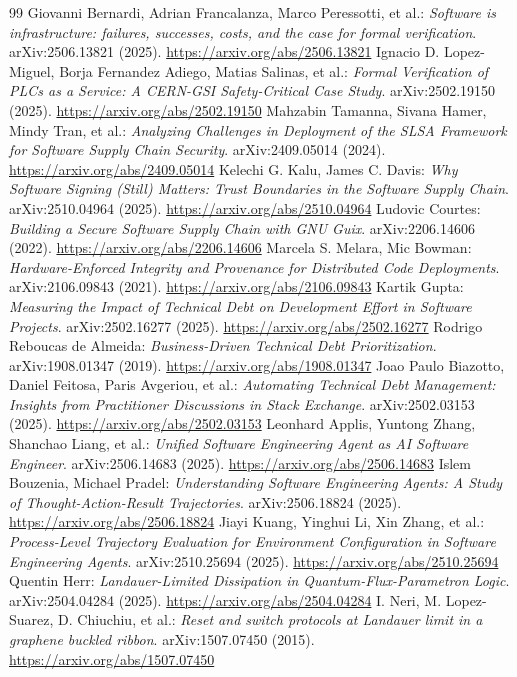 \documentclass[11pt,a4paper]{article}
\begin{document}
\begin{thebibliography}{99}
 Giovanni Bernardi, Adrian Francalanza, Marco Peressotti, et al.: \emph{Software is infrastructure: failures, successes, costs, and the case for formal verification}. arXiv:2506.13821 (2025). \url{https://arxiv.org/abs/2506.13821}
 Ignacio D. Lopez-Miguel, Borja Fernandez Adiego, Matias Salinas, et al.: \emph{Formal Verification of PLCs as a Service: A CERN-GSI Safety-Critical Case Study}. arXiv:2502.19150 (2025). \url{https://arxiv.org/abs/2502.19150}
 Mahzabin Tamanna, Sivana Hamer, Mindy Tran, et al.: \emph{Analyzing Challenges in Deployment of the SLSA Framework for Software Supply Chain Security}. arXiv:2409.05014 (2024). \url{https://arxiv.org/abs/2409.05014}
 Kelechi G. Kalu, James C. Davis: \emph{Why Software Signing (Still) Matters: Trust Boundaries in the Software Supply Chain}. arXiv:2510.04964 (2025). \url{https://arxiv.org/abs/2510.04964}
 Ludovic Courtes: \emph{Building a Secure Software Supply Chain with GNU Guix}. arXiv:2206.14606 (2022). \url{https://arxiv.org/abs/2206.14606}
 Marcela S. Melara, Mic Bowman: \emph{Hardware-Enforced Integrity and Provenance for Distributed Code Deployments}. arXiv:2106.09843 (2021). \url{https://arxiv.org/abs/2106.09843}
 Kartik Gupta: \emph{Measuring the Impact of Technical Debt on Development Effort in Software Projects}. arXiv:2502.16277 (2025). \url{https://arxiv.org/abs/2502.16277}
 Rodrigo Reboucas de Almeida: \emph{Business-Driven Technical Debt Prioritization}. arXiv:1908.01347 (2019). \url{https://arxiv.org/abs/1908.01347}
 Joao Paulo Biazotto, Daniel Feitosa, Paris Avgeriou, et al.: \emph{Automating Technical Debt Management: Insights from Practitioner Discussions in Stack Exchange}. arXiv:2502.03153 (2025). \url{https://arxiv.org/abs/2502.03153}
 Leonhard Applis, Yuntong Zhang, Shanchao Liang, et al.: \emph{Unified Software Engineering Agent as AI Software Engineer}. arXiv:2506.14683 (2025). \url{https://arxiv.org/abs/2506.14683}
 Islem Bouzenia, Michael Pradel: \emph{Understanding Software Engineering Agents: A Study of Thought-Action-Result Trajectories}. arXiv:2506.18824 (2025). \url{https://arxiv.org/abs/2506.18824}
 Jiayi Kuang, Yinghui Li, Xin Zhang, et al.: \emph{Process-Level Trajectory Evaluation for Environment Configuration in Software Engineering Agents}. arXiv:2510.25694 (2025). \url{https://arxiv.org/abs/2510.25694}
 Quentin Herr: \emph{Landauer-Limited Dissipation in Quantum-Flux-Parametron Logic}. arXiv:2504.04284 (2025). \url{https://arxiv.org/abs/2504.04284}
 I. Neri, M. Lopez-Suarez, D. Chiuchiu, et al.: \emph{Reset and switch protocols at Landauer limit in a graphene buckled ribbon}. arXiv:1507.07450 (2015). \url{https://arxiv.org/abs/1507.07450}
\end{thebibliography}
\end{document}
